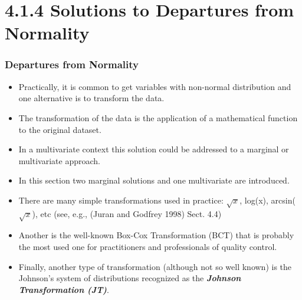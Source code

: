 \documentclass[]{beamer}
\begin{document}

\section{4.1.4 Solutions to Departures from Normality}
\begin{frame}
\frametitle{Departures from Normality}
\Large
\begin{itemize}
	\item Practically, it is common to get variables with non-normal distribution and one
	alternative is to transform the data. 
	\item The transformation of the data is the application
	of a mathematical function to the original dataset.
	\item In a multivariate context this solution could be addressed to a marginal or
	multivariate approach. 
	\item In this section two marginal solutions and one multivariate
	are introduced.
\end{itemize}
\end{frame}
\begin{frame}
\begin{itemize}
	\item There are many simple transformations used in practice: $\sqrt{x}$, log(x), arcsin($\sqrt{x}$),
	etc (see, e.g., (Juran and Godfrey 1998) Sect. 4.4)
	\item Another is the well-known Box-Cox Transformation (BCT) that is probably the
	most used one for practitioners and professionals of quality control. 
	\item Finally, another
	type of transformation (although not so well known) is the Johnson’s system of
	distributions recognized as the \textbf{\textit{Johnson Transformation (JT)}}.
\end{itemize}

\end{frame}
\end{document}
